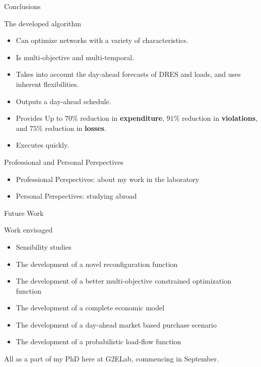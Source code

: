 \documentclass[xcolor=svgnames,aspectratio=32,8pt]{beamer}
\begin{document}

\begin{frame}
  {Conclusions}{}

    \begin{block}{The developed algorithm}
    \begin{itemize}
      \item Can optimize networks with a variety of characteristics.\\
      \item Is multi-objective and multi-temporal.\\
      \item Takes into account the day-ahead forecasts of DRES and loads, and uses inherent flexibilities.
      \item Outputs a day-ahead schedule.
      \item Provides Up to $70$\% reduction in \textbf{expenditure}, $91$\% reduction in \textbf{violations}, and $75$\% reduction in \textbf{losses}.\\
      \item Executes quickly.
    \end{itemize}
  \end{block}\pause

  \begin{block}{Professional and Personal Perspectives}
    \begin{itemize}
      \item Professional Perspectives: about my work in the laboratory
      \item Personal Perspectives: studying abroad
    \end{itemize}
  \end{block}

\end{frame}


\begin{frame}
  {Future Work}{}

  \begin{exampleblock}{Work envisaged}
    \begin{itemize}
      \item Sensibility studies
      \item The development of a novel reconfiguration function
      \item The development of a better multi-objective constrained optimization function
      \item The development of a complete economic model
      \item The development of a day-ahead market based purchase scenario
      \item The development of a probabilistic load-flow function
    \end{itemize}
  All as a part of my PhD here at G2ELab, commencing in September.
  \end{exampleblock}

\end{frame}
\end{document}
